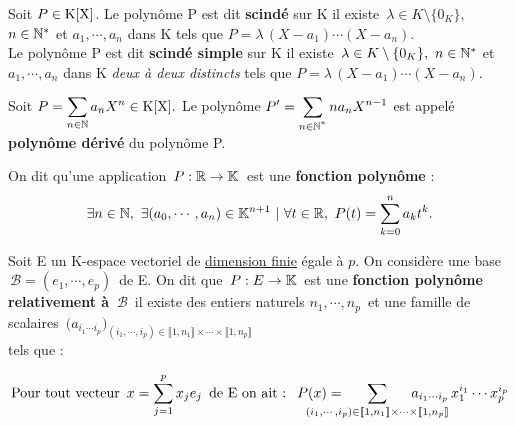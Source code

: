 \vspace{1.2cm}

Soit \(P\in \text{K}[\text{X}] \). Le polynôme P est dit \textbf{scindé} sur K \ssi il existe \(\, \lambda\in K\setminus \{0_K\},\)\\
\(n\in \mathbb{N}^*\) et \(a_1,\cdots,a_n\) dans K tels que \(P=\lambda\,(X-a_1)\cdots(X-a_n).\)\vspace{0.1cm}\\
Le polynôme P est dit \textbf{scindé simple} sur K \ssi il existe \(\, \lambda\in K\setminus \{0_K\},\ n\in \mathbb{N}^*\) et \(a_1,\cdots,a_n\) dans K \emph{deux à deux distincts} tels que \(P=\lambda\,(X-a_1)\cdots(X-a_n).\)

\vspace{1.4cm}

\noindent Soit \(\displaystyle P=\sum_{n\in \mathbb{N}}a_nX^n\in \text{K}[\text{X}]. \) Le polynôme \(\displaystyle P'=\sum_{n\in \mathbb{N}^{^*}}na_nX^{n-1} \) est appelé \textbf{polynôme dérivé} du polynôme P.

\vspace{1.3cm}

On dit qu'une application \(\,P : \mathbb{R} \to \mathbb{K}\,\) est une \textbf{fonction polynôme} \ssi :\vspace{-0.3cm} 
\[\exists n\in \NN,\ \exists (a_0,\cdots,a_n)\in \KK^{n+1} \ | \ \forall t\in \RR,\ P(t)=\sum_{k=0}^{n}a_kt^k. \]

\newpage

\noindent Soit E un K-espace vectoriel de \underline{dimension finie} égale à $p$. On considère une base \(\,\mathcal{B}=(e_1,\cdots,e_p)\,\) de E. On dit que \(\,P:E\to \mathbb{K}\,\) est une \textbf{fonction polynôme relativement à $\,\mathcal{B}\,$} \ssi il existe des entiers naturels \(n_1,\cdots,n_p\,\) et une famille de scalaires \(\,\displaystyle\bigl(a_{i_1\cdots i_p}\bigr)_{(i_1,\cdots,i_p)\in \llbracket 1,n_1 \rrbracket \times \cdots \times \llbracket 1,n_p \rrbracket}\)\\
tels que :

\[\text{Pour tout vecteur } \,x=\sum_{j=1}^{p}x_je_j\,\text{ de E on ait : }\ P(x)=\hspace{-1cm}\sum_{(i_1,\cdots,i_p)\in \llbracket 1,n_1 \rrbracket \times \cdots \times \llbracket 1,n_p \rrbracket}\hspace{-1cm}a_{i_1\cdots i_p}\,x_1^{i_1}\cdots x_p^{i_p}\]

\vspace{2.2cm}

